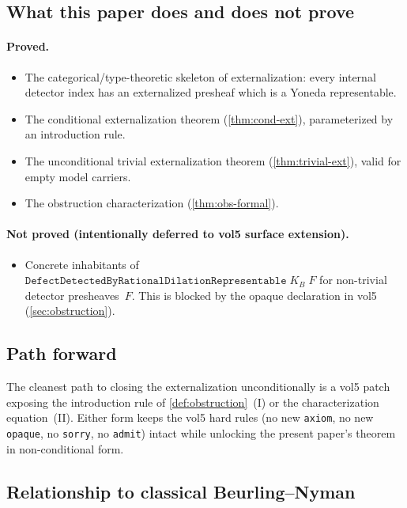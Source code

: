\documentclass[12pt]{article}
\theoremstyle{plain}
\theoremstyle{definition}
\theoremstyle{remark}
\newcommand{\KB}{K_{B}}
\begin{document}
\subsection{What this paper does and does not prove}

\paragraph{Proved.}
\begin{itemize}
  \item The categorical/type-theoretic skeleton of externalization:
    every internal detector index has an externalized presheaf which
    is a Yoneda representable.
  \item The conditional externalization theorem
    (\cref{thm:cond-ext}), parameterized by an introduction rule.
  \item The unconditional trivial externalization theorem
    (\cref{thm:trivial-ext}), valid for empty model carriers.
  \item The obstruction characterization
    (\cref{thm:obs-formal}).
\end{itemize}

\paragraph{Not proved (intentionally deferred to vol5 surface
extension).}
\begin{itemize}
  \item Concrete inhabitants of
    $\texttt{DefectDetectedByRationalDilationRepresentable}\;\KB\;F$
    for non-trivial detector presheaves~$F$.  This is blocked by the
    opaque declaration in vol5 (\cref{sec:obstruction}).
\end{itemize}

\subsection{Path forward}

The cleanest path to closing the externalization unconditionally is a
vol5 patch exposing the introduction rule of \cref{def:obstruction}~(I)
or the characterization equation~(II).  Either form keeps the vol5
hard rules (no new \texttt{axiom}, no new \texttt{opaque}, no
\texttt{sorry}, no \texttt{admit}) intact while unlocking the present
paper's theorem in non-conditional form.

\subsection{Relationship to classical Beurling--Nyman}
\end{document}
